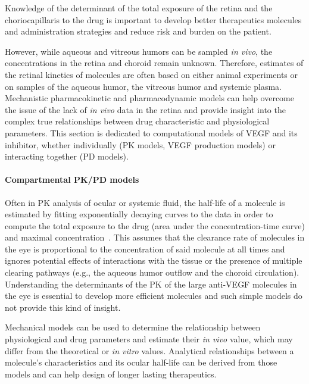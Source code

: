 \documentclass{article}
\begin{document}
Knowledge of the determinant of the total exposure of the retina and the choriocapillaris to the drug is important to develop better therapeutics molecules and administration strategies and reduce risk and burden on the patient.

However, while aqueous and vitreous humors can be sampled \textit{in vivo}, the concentrations in the retina and choroid remain unknown. 
Therefore, estimates of the retinal kinetics of molecules are often based on either animal experiments or on samples of the aqueous humor, the vitreous humor and systemic plasma.
Mechanistic pharmacokinetic and pharmacodynamic models can help overcome the issue of the lack of \textit{in vivo} data in the retina and provide insight into the complex true relationships between drug characteristic and physiological parameters.
This section is dedicated to computational models of VEGF and its inhibitor, whether individually (PK models, VEGF production models) or interacting together (PD models).

\paragraph*{Compartmental PK/PD models}

Often in PK analysis of ocular or systemic fluid, the half-life of a molecule is estimated by fitting exponentially decaying curves to the data in order to compute the total exposure to the drug (area under the concentration-time curve) and maximal concentration~\cite{Bakri_2007, Kaiser_2019, Park_2015, Park_2016, Xu_2013}.
This assumes that the clearance rate of molecules in the eye is proportional to the concentration of said molecule at all times and ignores potential effects of interactions with the tissue or the presence of multiple clearing pathways (e.g., the aqueous humor outflow and the choroid circulation).
Understanding the determinants of the PK of the large anti-VEGF molecules in the eye is essential to develop more efficient molecules and such simple models do not provide this kind of insight.

Mechanical models can be used to determine the relationship between physiological and drug parameters and estimate their \textit{in vivo} value, which may differ from the theoretical or \textit{in vitro} values.
Analytical relationships between a molecule's characteristics and its ocular half-life can be derived from those models and can help design of longer lasting therapeutics.
\end{document}

